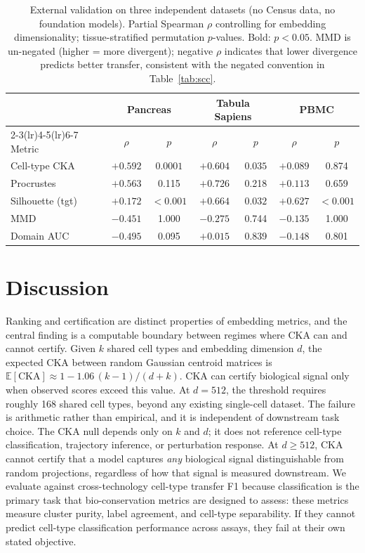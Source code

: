 \documentclass[11pt]{article}
\begin{document}
\medskip
\begin{table}[t]
\centering
\caption{External validation on three independent datasets (no Census
data, no foundation models). Partial Spearman $\rho$ controlling for
embedding dimensionality; tissue-stratified permutation $p$-values.
Bold: $p < 0.05$. MMD is un-negated (higher = more divergent);
negative $\rho$ indicates that lower divergence predicts better
transfer, consistent with the negated convention in
Table~\ref{tab:scc}.}
\label{tab:external}
\small
\begin{tabular}{@{}lcccccc@{}}
\toprule
& \multicolumn{2}{c}{Pancreas} & \multicolumn{2}{c}{Tabula Sapiens} & \multicolumn{2}{c}{PBMC} \\
\cmidrule(lr){2-3}\cmidrule(lr){4-5}\cmidrule(lr){6-7}
Metric & $\rho$ & $p$ & $\rho$ & $p$ & $\rho$ & $p$ \\
\midrule
Cell-type CKA & $+0.592$ & $\mathbf{0.0001}$ & $+0.604$ & $\mathbf{0.035}$ & $+0.089$ & 0.874 \\
Procrustes    & $+0.563$ & 0.115              & $+0.726$ & 0.218             & $+0.113$ & 0.659 \\
\midrule
Silhouette (tgt) & $+0.172$ & $\mathbf{<0.001}$ & $+0.664$ & $\mathbf{0.032}$ & $+0.627$ & $\mathbf{<0.001}$ \\
MMD              & $-0.451$ & 1.000              & $-0.275$ & 0.744             & $-0.135$ & 1.000 \\
Domain AUC       & $-0.495$ & 0.095              & $+0.015$ & 0.839             & $-0.148$ & 0.801 \\
\bottomrule
\end{tabular}
\end{table}


\section{Discussion}
\label{sec:discussion}

Ranking and certification are distinct properties of embedding metrics,
and the central finding is a computable boundary between regimes where
CKA can and cannot certify. Given $k$ shared cell types and embedding
dimension $d$, the expected CKA between random Gaussian centroid
matrices is $\mathbb{E}[\mathrm{CKA}] \approx 1 -
1.06\,(k{-}1)/(d{+}k)$. CKA can certify biological signal only when
observed scores exceed this value. At $d = 512$, the threshold requires
roughly 168 shared cell types, beyond any existing single-cell dataset.
The failure is arithmetic rather than empirical, and it is independent
of downstream task choice. The CKA null depends only on $k$ and $d$;
it does not reference cell-type classification, trajectory inference,
or perturbation response. At $d \geq 512$, CKA cannot certify that a
model captures \emph{any} biological signal distinguishable from random
projections, regardless of how that signal is measured downstream. We
evaluate against cross-technology cell-type transfer F1 because
classification is the primary task that bio-conservation metrics are
designed to assess: these metrics measure cluster purity, label
agreement, and cell-type separability. If they cannot predict cell-type
classification performance across assays, they fail at their own stated
objective.
\end{document}
